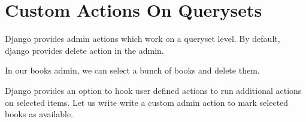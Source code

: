 \documentclass[letterpaper,12pt,english]{sphinxmanual}
\begin{document}
\section{Custom Actions On Querysets}
\label{\detokenize{admin_custom_admin_actions:custom-actions-on-querysets}}
Django provides admin actions which work on a queryset level. By default, django provides delete action in the admin.

In our books admin, we can select a bunch of books and delete them.


Django provides an option to hook user defined actions to run additional actions on selected items. Let us write write a custom admin action to mark selected books as available.

\begin{sphinxVerbatim}[commandchars=\\\{\}]
 
      
        

        
      
\end{sphinxVerbatim}

\end{document}
